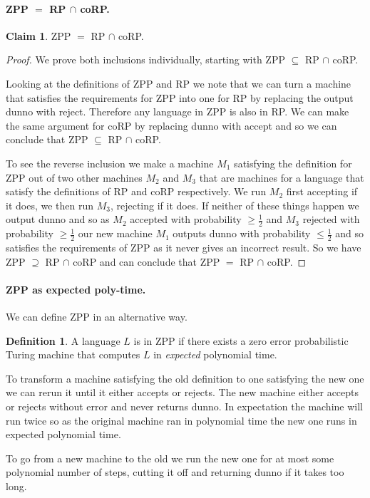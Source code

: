 \documentclass[11pt,a4paper]{article}
\theoremstyle{definition}
\newtheorem{claim}{Claim}
\newtheorem{defn}{Definition}
\begin{document}
\paragraph{ZPP $=$ RP $\cap$ coRP.}
\begin{claim}
ZPP $=$ RP $\cap$ coRP.
\end{claim}
\begin{proof}
We prove both inclusions individually, starting with ZPP $\subseteq$ RP $\cap$ coRP.

Looking at the definitions of ZPP and RP we note that we can turn a machine that satisfies the requirements for ZPP into one for RP by replacing the output dunno with reject.
Therefore any language in ZPP is also in RP.
We can make the same argument for coRP by replacing dunno with accept and so we can conclude that ZPP $\subseteq$ RP $\cap$ coRP.

To see the reverse inclusion we make a machine $M_1$ satisfying the definition for ZPP out of two other machines $M_2$ and $M_3$ that are machines for a language that satisfy the definitions of RP and coRP respectively.
We run $M_2$ first accepting if it does, we then run $M_3$, rejecting if it does.
If neither of these things happen we output dunno and so as $M_2$ accepted with probability $\ge \frac{1}{2}$ and $M_3$ rejected with probability $\ge \frac{1}{2}$ our new machine $M_1$ outputs dunno with probability $\le \frac{1}{2}$ and so satisfies the requirements of ZPP as it never gives an incorrect result.
So we have ZPP $\supseteq$ RP $\cap$ coRP and can conclude that ZPP $=$ RP $\cap$ coRP.
\end{proof}

\paragraph{ZPP as expected poly-time.}
We can define ZPP in an alternative way.
\begin{defn}
A language $L$ is in ZPP if there exists a zero error probabilistic Turing machine that computes $L$ in \emph{expected} polynomial time.
\end{defn}
To transform a machine satisfying the old definition to one satisfying the new one we can rerun it until it either accepts or rejects.
The new machine either accepts or rejects without error and never returns dunno.
In expectation the machine will run twice so as the original machine ran in polynomial time the new one runs in expected polynomial time.

To go from a new machine to the old we run the new one for at most some polynomial number of steps, cutting it off and returning dunno if it takes too long.
\end{document}

